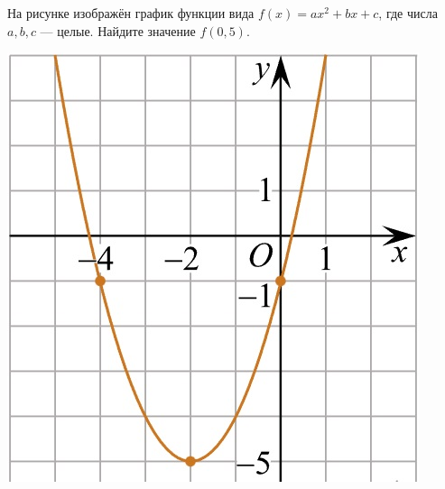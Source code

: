 \begin{homework}[number=2]
\begin{listofex}
\begin{minipage}[c]{0.25\textwidth}
		\end{minipage}
		\item
		\begin{minipage}[t]{0.67\textwidth}
			На рисунке изображён график функции вида \(f(x)=ax^2+bx+c\), где числа \(a, b, c\) --- целые. Найдите значение \(f(0,5)\).
		\end{minipage}
		\begin{minipage}[c]{0.25\textwidth}
			\includegraphics[width=\textwidth]{pics/G101M4H2-4.jpg}
		\end{minipage}

\end{listofex}
\end{homework}
